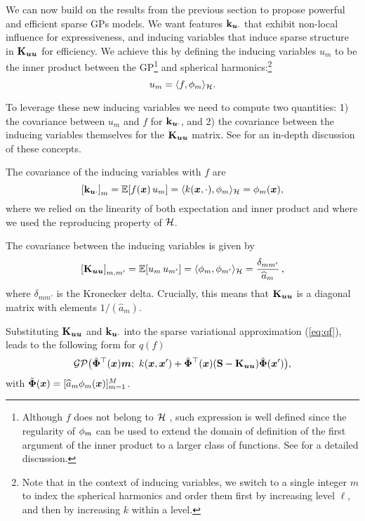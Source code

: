 We can now build on the results from the previous section to propose powerful and efficient sparse GPs models. We want features $\mathbf{k}_{\bm{u} \cdot}$ that exhibit non-local influence for expressiveness, and inducing variables that induce sparse structure in $\mathbf{{K}}_{\bm{u} \bm{u}}$ for efficiency. We achieve this by defining the inducing variables $u_m$ to be the inner product between the GP\footnote{Although $f$ does not belong to ${\mathcal{H}}$ \citep{kanagawa2018gaussian}, such expression is well defined since the regularity of $\phi_{m}$ can be used to extend the domain of definition of the first argument of the inner product to a larger class of functions. See \citet{hensman2017variational} for a detailed discussion.} and spherical harmonics:\footnote{Note that in the context of inducing variables, we switch to a single integer $m$ to index the spherical harmonics and order them first by increasing level $\ell$, and then by increasing $k$ within a level.}
\begin{equation}
  u_m = \langle f, \phi_m\rangle_{{\mathcal{H}}}.
\end{equation}

To leverage these new inducing variables we need to compute two quantities: 1) the covariance between $u_m$ and $f$ for $\mathbf{k}_{\bm{u} \cdot}$, and 2) the covariance between the inducing variables themselves for the $\mathbf{{K}}_{\bm{u} \bm{u}}$ matrix. See \citet{GPflow2020multioutput} for an in-depth discussion of these concepts.

The covariance of the inducing variables with $f$ are
\begin{equation*}
   \left[\kux \right]_m = \ExpSymb[f(\vx)\,u_m] %
    = \langle k(\vx, \cdot), \sh_m \rangle_{\rkhs} 
    = \sh_{m}(\vx),
\end{equation*}
where we relied on the linearity of both expectation and inner product and where we used the reproducing property of ${\mathcal{H}}$.

The covariance between the inducing variables is given by
\begin{equation*}
    \left[\Kuu \right]_{m, m'} = \ExpSymb \left[u_m\,u_{m'} \right] 
    = \langle \sh_{m}, \sh_{m'} \rangle_{\rkhs} 
    = \frac{\delta_{mm'}}{\widehat{a}_m}\, ,
\end{equation*}
where $\delta_{mm'}$ is the Kronecker delta. Crucially, this means that $\mathbf{{K}}_{\bm{u} \bm{u}}$ is a diagonal matrix with elements $1/(\widehat{a}_m)$.

Substituting $\mathbf{{K}}_{\bm{u} \bm{u}}$ and $\mathbf{k}_{\bm{u} \cdot}$ into the sparse variational approximation (\cref{eq:qf}), leads to the following form for $q(f)$
\begin{equation*}
    \GP\left(\tilde{\bm{\Phi}}^\top(\vx) \vm;\ k(\vx, \vx') + \tilde{\bm{\Phi}}^\top(\vx) (\MS - \Kuu) \tilde{\bm{\Phi}}(\vx') \right),
\end{equation*}
with $\tilde{\bm{\Phi}}(\bm{x}) = [\widehat{a}_m \phi_m(\bm{x})]_{m=1}^M$.

